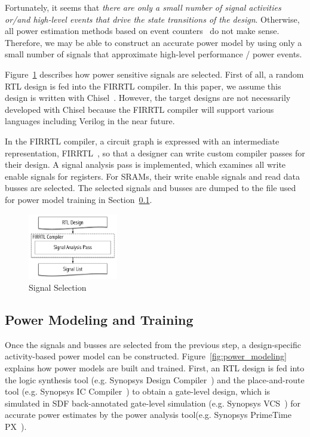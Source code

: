 Fortunately, it seems that \emph{there are only a small number of signal activities
or/and high-level events that drive the state transitions of the design}.
Otherwise, all power estimation methods based on event counters~\cite{Bellosa2000,
Bircher2003, Isci2003,Bircher2005, Bircher2007, Bertran2013} do not make sense.
Therefore, we may be able to construct an accurate power model by using only
a small number of signals that approximate high-level performance / power events.

Figure~\ref{fig:signal_selection} describes how power sensitive signals
are selected. First of all, a random RTL design is fed into the FIRRTL compiler.
In this paper, we assume this design is written with Chisel~\cite{Bachrach2012}.
However, the target designs are not necessarily developed with Chisel
because the FIRRTL compiler will support various languages including Verilog in the near future.

In the FIRRTL compiler, a circuit graph is expressed with an intermediate representation,
FIRRTL~\cite{Li:EECS-2016-9}, so that a designer can write custom compiler passes for their
design. A signal analysis pass is implemented, which examines all write enable signals
for registers. For SRAMs, their write enable signals and read data busses are selected.
The selected signals and busses are dumped to the file used for
power model training in Section~\ref{sec:power_modeling}.

\begin{figure}[!ht]
	\centering
	\includegraphics[width=0.35\textwidth,height=\textheight,keepaspectratio]{images/signal_selection.pdf}
	\caption{Signal Selection}
	\label{fig:signal_selection}
\end{figure}

\subsection{Power Modeling and Training}
\label{sec:power_modeling}
Once the signals and busses are selected from the previous step, 
a design-specific activity-based power model can be constructed.
Figure~\ref{fig:power_modeling} explains how power models are built and trained.
First, an RTL design is fed into the logic synthesis tool
(e.g. Synopsys Design Compiler~\textregistered) and the place-and-route tool
(e.g. Synopsys IC Compiler~\textregistered) to obtain a gate-level design,
which is simulated in SDF back-annotated gate-level simulation
(e.g. Synopsys VCS~\textregistered) for accurate power estimates
by the power analysis tool(e.g. Synopsys PrimeTime PX~\textregistered).

